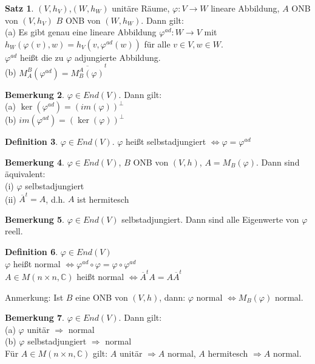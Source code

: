 \documentclass[10pt,a4paper,numbers=endperiod]{scrartcl}
\theoremstyle{definition}
\newtheorem{satz}{Satz}[section]
\newtheorem{defi}[satz]{Definition}
\newtheorem{bem}[satz]{Bemerkung}
\def\CC{{\mathbb C}}
\begin{document}
\begin{satz}
	$(V, h_V)$,$(W, h_W)$ unitäre Räume, $\varphi: V\rightarrow W$ lineare Abbildung, $A$ ONB von $(V, h_V)$ $B$ ONB von $(W,h_W)$. Dann gilt:\\
	(a) Es gibt genau eine lineare Abbildung $\varphi^{ad}: W \rightarrow V$ mit $h_W(\varphi(v), w) = h_V(v, \varphi^{ad}(w))$ für alle $v \in V, w \in W$.\\ $\varphi^{ad}$ heißt die zu $\varphi$ adjungierte Abbildung.\\
	(b) $M_A^B(\varphi^{ad}) = \overline{M_B^A(\varphi)}^t$
\end{satz}

\begin{bem}
	$\varphi \in End(V)$. Dann gilt:\\
	(a) $\ker(\varphi^{ad}) = (im (\varphi))^\perp$\\
	(b) $im(\varphi^{ad}) = (\ker(\varphi))^\perp$
\end{bem}

\begin{defi}
	$\varphi \in End(V)$. $\varphi$ heißt selbstadjungiert $\Leftrightarrow \varphi = \varphi^{ad}$
\end{defi}

\begin{bem}
	$\varphi \in End(V)$, $B$ ONB von $(V,h)$, $A = M_B(\varphi)$. Dann sind äquivalent:\\
	(i) $\varphi$ selbstadjungiert\\
	(ii) $\overline{A}^t = A$, d.h. $A$ ist hermitesch
\end{bem}

\begin{bem}
	$\varphi \in End(V)$ selbstadjungiert. Dann sind alle Eigenwerte von $\varphi$ reell.
\end{bem}

\begin{defi}
	$\varphi \in End(V)$\\
	$\varphi$ heißt normal $\Leftrightarrow \varphi^{ad} \circ \varphi = \varphi \circ \varphi^{ad}$\\
	$A \in M(n \times n, \CC)$ heißt normal $\Leftrightarrow \overline{A}^t A  = A \overline{A}^t$
\end{defi}

Anmerkung: Ist $B$ eine ONB von $(V,h)$, dann: $\varphi$ normal $\Leftrightarrow M_B(\varphi)$ normal.

\begin{bem}
	$\varphi \in End(V)$. Dann gilt:\\
	(a) $\varphi$ unitär $\Rightarrow$ normal\\
	(b) $\varphi$ selbstadjungiert $\Rightarrow$ normal\\
	Für $A \in M(n \times n, \CC)$ gilt: $A$ unitär $\Rightarrow A$ normal, $A$ hermitesch $\Rightarrow A$ normal.
\end{bem}
\end{document}
